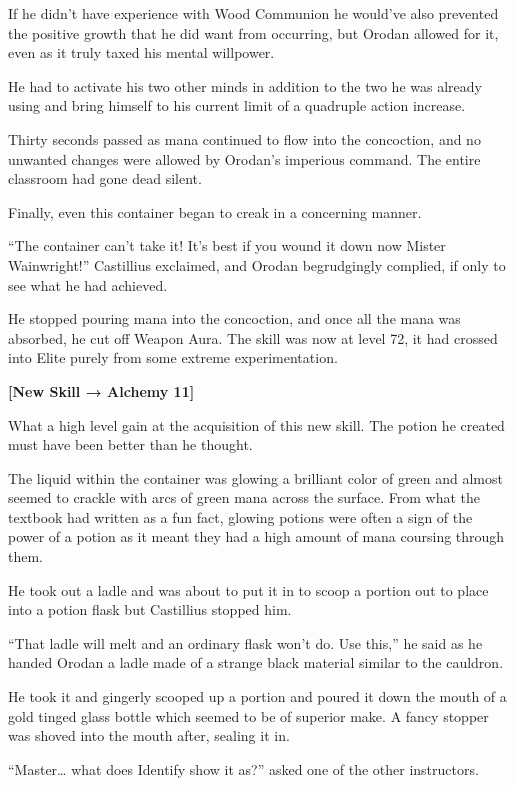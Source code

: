 \documentclass[a4paper,10pt]{book}
\begin{document}
If he didn’t have experience with Wood Communion he would’ve also prevented the positive growth that he did want from occurring, but Orodan allowed for it, even as it truly taxed his mental willpower.\par
He had to activate his two other minds in addition to the two he was already using and bring himself to his current limit of a quadruple action increase.\par
Thirty seconds passed as mana continued to flow into the concoction, and no unwanted changes were allowed by Orodan’s imperious command. The entire classroom had gone dead silent.\par
Finally, even this container began to creak in a concerning manner.\par
“The container can’t take it! It’s best if you wound it down now Mister Wainwright!” Castillius exclaimed, and Orodan begrudgingly complied, if only to see what he had achieved.\par
He stopped pouring mana into the concoction, and once all the mana was absorbed, he cut off Weapon Aura. The skill was now at level 72, it had crossed into Elite purely from some extreme experimentation.\par
\textbf{[New Skill → Alchemy 11]}\par
What a high level gain at the acquisition of this new skill. The potion he created must have been better than he thought.\par
The liquid within the container was glowing a brilliant color of green and almost seemed to crackle with arcs of green mana across the surface. From what the textbook had written as a fun fact, glowing potions were often a sign of the power of a potion as it meant they had a high amount of mana coursing through them.\par
He took out a ladle and was about to put it in to scoop a portion out to place into a potion flask but Castillius stopped him.\par
“That ladle will melt and an ordinary flask won’t do. Use this,” he said as he handed Orodan a ladle made of a strange black material similar to the cauldron.\par
He took it and gingerly scooped up a portion and poured it down the mouth of a gold tinged glass bottle which seemed to be of superior make. A fancy stopper was shoved into the mouth after, sealing it in.\par
“Master… what does Identify show it as?” asked one of the other instructors.\par
\end{document}
